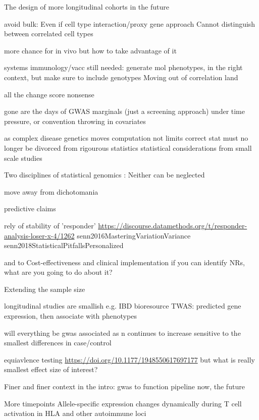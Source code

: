 \begin{outline}
The design of more longitudinal cohorts in the future

    avoid bulk:
        Even if cell type interaction/proxy gene approach
        Cannot distinguish between correlated cell types

    more chance for in vivo
        but how to take advantage of it

    systems immunology/vacc still needed: generate mol phenotypes, in the right context,
    but make sure to include genotypes
    Moving out of correlation land

    all the change score nonsense

    gone are the days of GWAS marginals (just a screening approach)
        under time pressure, or convention
        throwing in covariates

    as     complex disease genetics moves 
    computation not limits correct stat
    must no longer be divorced from rigourous statistics
        statistical considerations from small scale studies

        Two disciplines of statistical genomics : Neither can be neglected

    move away from dichotomania

        predictive claims

            rely of stability of 'responder'
                \url{https://discourse.datamethods.org/t/responder-analysis-loser-x-4/1262}
                senn2016MasteringVariationVariance
                senn2018StatisticalPitfallsPersonalized

        and to Cost-effectiveness and clinical implementation
            if you can identify NRs, what are you going to do about it?

Extending the sample size

    longitudinal studies are smallish
    e.g. IBD bioresource
        TWAS: predicted gene expression, then associate with phenotypes

    will everything be gwas associated as n continues to increase
    sensitive to the smallest differences in case/control
    
    equiavlence testing \url{https://doi.org/10.1177/1948550617697177}
        but what is really smallest effect size of interest?

Finer and finer context
    in the intro: gwas to function pipeline
    now, the future

    More timepoints
    Allele-specific expression changes dynamically during T cell activation in HLA and other autoimmune loci


\end{outline}
